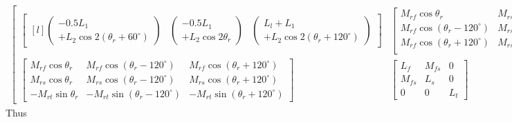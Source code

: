 \documentclass[a4paper,numbers=noenddot,12pt]{scrbook}
\begin{document}
\begin{multline}
\begin{bmatrix}
\begin{bmatrix*}[l]
\begin{pmatrix}
                    - 0.5 L_1 \\ + L_2 \cos 2(\theta_r + 60^{\circ}) 
                \end{pmatrix}
                &
                \begin{pmatrix}
                    -0.5 L_1 \\ + L_2 \cos 2 \theta_r
                \end{pmatrix}
                &
                \begin{pmatrix}
                    L_l + L_1 \\ + L_2 \cos 2(\theta_r  + 120^{\circ})
                \end{pmatrix}
            \end{bmatrix*} &
            \begin{bmatrix}
                M_{rf} \cos \theta_r & M_{rs} \cos \theta_r & - M_{rt} \sin \theta_r \\
                M_{rf} \cos (\theta_r - 120^{\circ}) & M_{rs} \cos(\theta_r - 120^{\circ}) & - M_{rt} \sin (\theta_r - 120^{\circ}) \\ 
                M_{rf} \cos(\theta_r + 120^{\circ}) & M_{rs} \cos(\theta_r + 120^{\circ}) & - M_{rt} \cos(\theta_r + 120^{\circ}) \\
            \end{bmatrix}\\
            \begin{bmatrix}
                M_{rf} \cos\theta_r & M_{rf} \cos(\theta_r - 120^{\circ}) & M_{rf} \cos(\theta_r + 120^{\circ}) \\
                M_{rs} \cos\theta_r & M_{rs} \cos(\theta_r - 120^{\circ}) & M_{rs} \cos(\theta_r + 120^{\circ}) \\
                - M_{rt} \sin \theta_r & - M_{rt} \sin (\theta_r - 120^{\circ}) & - M_{rt} \sin(\theta_r + 120^{\circ})
            \end{bmatrix} &
            \begin{bmatrix}
                L_f & M_{fs} & 0 \\
                M_{fs} & L_s & 0 \\
                0 & 0 & L_t
            \end{bmatrix}
        \end{bmatrix}
        \label{eq:Eq8.22}
    \end{multline}
    Thus
\end{document}
